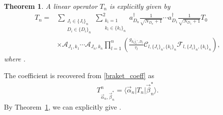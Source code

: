 \documentclass[pdftex]{sigma}
\numberwithin{equation}{section}
\newtheorem{Theorem}{Theorem}[section]
\begin{document}
\begin{Theorem}\label{thm_G24_opr}
A linear operator $T_{n}$ is explicitly given by
\begin{align}
T_{n}
={}&
\sum_{
 \substack{
 J_{i}
 \in
 \{
 J_{i}
 \}_{n}
 \\
 D_{i}
 \in
 \{
 D_{i}
 \}_{n}
 }
}
\sum_{
 \substack{
 k_{i}=1
 \\
 k_{i}
 \in
 \{
 k_{i}
 \}_{n}
 }
}^{2}
a_{D_{n}}^{\dagger}
\frac{1}{
 \sqrt{
 N_{D_{n}}
 +
 1
 }
}
\cdots
a_{D_{1}}^{\dagger}
\frac{1}{
 \sqrt{
 N_{D_{1}}
 +
 1
 }
}
T_{0}
\nonumber
\\
&
\times
\mathcal{A}_{
J_{1},
k_{1}
}
\cdots
\mathcal{A}_{
J_{n},
k_{n}
}
\prod_{l=1}^{n}
 \left(
\frac{
 g_{\overline{k_{l}{j_{l}}'},D_{l}}
}{
 \tau_{l}
}
\mathcal{C}_{
l,
\{
 J_{i}
\}_{n},
\{
 k_{i}
\}_{n}
}
\mathcal{F}_{
l,
\{
 J_{i}
\}_{n},
\{
 k_{i}
\}_{n}
}
 \right),
\label{star_coeff_G2_4_Opr}
\end{align}
where
.
\end{Theorem}

The coefficient
 is recovered from \eqref{braket_coeff} as
\begin{align}
 T^{n}_{\vec{\alpha}_{n},\vec{\beta}_{n}^{\ast}}
 =
 \langle
 \vec{\alpha}_{n}
 |
 T_{n}
 |
 \vec{\beta}_{n}^{\ast}
 \rangle
 .
 \label{opr_T_norm}
\end{align}
By Theorem~\ref{thm_G24_opr}, we can explicitly give .
\end{document}
